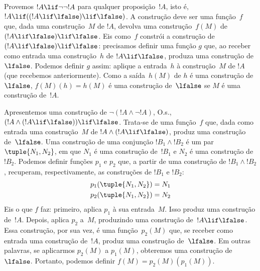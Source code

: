 \documentclass[../../../include/open-logic-section]{subfiles}
\begin{document}
\begin{ex}
Provemos $!A \lif \lnot \lnot !A$ para qualquer proposição~$!A$, isto
é, $!A \lif ((!A \lif \lfalse) \lif \lfalse)$. A construção deve ser
uma função~$f$ que, dada uma construção~$M$ de $!A$, devolva uma
construção~$f(M)$ de $(!A \lif \lfalse) \lif \lfalse$. Eis como~$f$
constrói a construção de $(!A \lif \lfalse) \lif \lfalse$: precisamos
definir uma função $g$ que, ao receber como entrada uma construção~$h$
de $!A \lif \lfalse$, produza uma construção de~$\lfalse$. Podemos
definir $g$ assim: aplique a entrada~$h$ à construção~$M$ de $!A$ (que
recebemos anteriormente). Como a saída~$h(M)$ de $h$ é uma construção
de $\lfalse$, $f(M)(h) = h(M)$ é uma construção de~$\lfalse$ se $M$ é
uma construção de~$!A$.
\end{ex}

\begin{ex}
Apresentemos uma construção de $\lnot(!A \land \lnot !A)$, O.s.\@,
$(!A \land (!A \lif \lfalse)) \lif \lfalse$. Trata-se de uma função~$f$
que, dada como entrada uma construção~$M$ de
$!A \land (!A \lif \lfalse)$, produz uma construção de~$\lfalse$. Uma
construção de uma conjunção $!B_1 \land !B_2$ é um par
$\tuple{N_1, N_2}$, em que $N_1$ é uma construção de~$!B_1$ e $N_2$ é
uma construção de~$!B_2$. Podemos definir funções $p_1$ e $p_2$ que,
a partir de uma construção de $!B_1 \land !B_2$, recuperam,
respectivamente, as construções de $!B_1$ e $!B_2$:
\begin{align*}
  p_1(\tuple{N_1, N_2}) &= N_1\\
  p_2(\tuple{N_1, N_2}) &= N_2
\end{align*}
Eis o que $f$ faz: primeiro, aplica $p_1$ à sua entrada~$M$. Isso
produz uma construção de~$!A$. Depois, aplica $p_2$ a~$M$, produzindo
uma construção de~$!A \lif \lfalse$. Essa construção, por sua vez, é
uma função~$p_2(M)$ que, se receber como entrada uma construção de~$!A$,
produz uma construção de~$\lfalse$. Em outras palavras, se aplicarmos
$p_2(M)$ a $p_1(M)$, obteremos uma construção de~$\lfalse$. Portanto,
podemos definir $f(M) = p_2(M)(p_1(M))$.
\end{ex}
\end{document}
